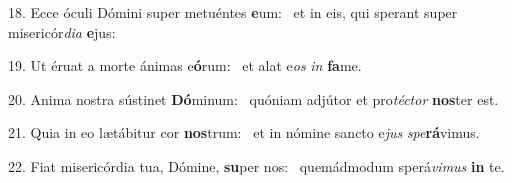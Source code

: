 18. Ecce óculi Dómini super metuéntes \textbf{e}um: \ast\  et in eis, qui sperant super misericór\textit{di}\textit{a} \textbf{e}jus:\

19. Ut éruat a morte ánimas e\textbf{ó}rum: \ast\  et alat e\textit{os} \textit{in} \textbf{fa}me.\

20. Anima nostra sústinet \textbf{Dó}minum: \ast\  quóniam adjútor et pro\textit{téc}\textit{tor} \textbf{nos}ter est.\

21. Quia in eo lætábitur cor \textbf{nos}trum: \ast\  et in nómine sancto e\textit{jus} \textit{spe}\textbf{rá}vimus.\

22. Fiat misericórdia tua, Dómine, \textbf{su}per nos: \ast\  quemádmodum sperá\textit{vi}\textit{mus} \textbf{in} te.\

